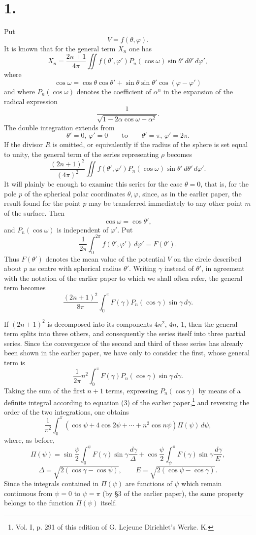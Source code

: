 \documentclass[11pt]{article}
\newcommand{\dd}{\,d}
\begin{document}
\section*{1.}

Put
\[
 V=f(\theta,\varphi).
\]
It is known that for the general term $X_n$ one has
\[
 X_n=\frac{2n+1}{4\pi}\iint f(\theta',\varphi')P_n(\cos\omega)\sin\theta'\dd\theta'\dd\varphi',
\]
where
\[
 \cos\omega=\cos\theta\cos\theta' + \sin\theta\sin\theta'\cos(\varphi-\varphi')
\]
and where $P_n(\cos\omega)$ denotes the coefficient of $\alpha^n$ in the expansion of the radical expression
\[
 \frac{1}{\sqrt{1-2\alpha\cos\omega+\alpha^2}}.
\]
The double integration extends from
\[
 \theta'=0,\,\varphi'=0 \qquad\text{to}\qquad \theta'=\pi,\,\varphi'=2\pi.
\]
If the divisor $R$ is omitted, or equivalently if the radius of the sphere is set equal to unity, the general term of the series representing $\rho$ becomes
\[
 \frac{(2n+1)^2}{(4\pi)^2}\iint f(\theta',\varphi')P_n(\cos\omega)\sin\theta'\dd\theta'\dd\varphi'.
\]
It will plainly be enough to examine this series for the case $\theta=0$, that is, for the pole $p$ of the spherical polar coordinates $\theta,\varphi$, since, as in the earlier paper, the result found for the point $p$ may be transferred immediately to any other point $m$ of the surface. Then
\[
 \cos\omega=\cos\theta',
\]
and $P_n(\cos\omega)$ is independent of $\varphi'$. Put
\[
 \frac{1}{2\pi}\int_0^{2\pi} f(\theta',\varphi')\dd\varphi'=F(\theta').
\]
Thus $F(\theta')$ denotes the mean value of the potential $V$ on the circle described about $p$ as centre with spherical radius $\theta'$. Writing $\gamma$ instead of $\theta'$, in agreement with the notation of the earlier paper to which we shall often refer, the general term becomes
\[
 \frac{(2n+1)^2}{8\pi}\int_0^\pi F(\gamma)P_n(\cos\gamma)\sin\gamma\dd\gamma.
\]

If $(2n+1)^2$ is decomposed into its components $4n^2$, $4n$, $1$, then the general term splits into three others, and consequently the series itself into three partial series. Since the convergence of the second and third of these series has already been shown in the earlier paper, we have only to consider the first, whose general term is
\[
 \frac{1}{2\pi}n^2\int_0^\pi F(\gamma)P_n(\cos\gamma)\sin\gamma\dd\gamma.
\]
Taking the sum of the first $n+1$ terms, expressing $P_n(\cos\gamma)$ by means of a definite integral according to equation (3) of the earlier paper,\footnote{Vol. I, p. 291 of this edition of G. Lejeune Dirichlet's Werke. K.} and reversing the order of the two integrations, one obtains
\[
 \frac{1}{\pi^2}\int_0^\pi(\cos\psi+4\cos2\psi+\cdots+n^2\cos n\psi)\Pi(\psi)\dd\psi,
\]
where, as before,
\[
 \Pi(\psi)=\sin\frac{\psi}{2}\int_0^\psi F(\gamma)\sin\gamma\frac{\dd\gamma}{\Delta}
 +\cos\frac{\psi}{2}\int_\psi^\pi F(\gamma)\sin\gamma\frac{\dd\gamma}{E},
\]
\[
 \Delta=\sqrt{2(\cos\gamma-\cos\psi)},\qquad E=\sqrt{2(\cos\psi-\cos\gamma)}.
\]
Since the integrals contained in $\Pi(\psi)$ are functions of $\psi$ which remain continuous from $\psi=0$ to $\psi=\pi$ (by §3 of the earlier paper), the same property belongs to the function $\Pi(\psi)$ itself.
\end{document}
